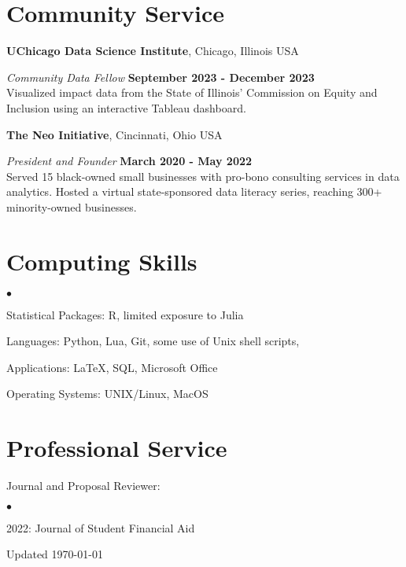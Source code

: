 \documentclass[margin,line]{res}
\newenvironment{list2}{
  \begin{list}{$\bullet$}{%
      \setlength{\itemsep}{0in}
      \setlength{\parsep}{0in} \setlength{\parskip}{0in}
      \setlength{\topsep}{0in} \setlength{\partopsep}{0in} 
      \setlength{\leftmargin}{0.2in}}}{\end{list}}
\begin{document}
\begin{resume}
\section{\sc Community Service}
{\bf UChicago Data Science Institute}, Chicago, Illinois USA

\vspace{-.3cm}
{\em Community Data Fellow} \hfill {\bf September 2023 - December 2023}\\
Visualized impact data from the State of Illinois' Commission on Equity and Inclusion using an interactive Tableau dashboard. 

{\bf The Neo Initiative}, Cincinnati, Ohio USA

\vspace{-.3cm}
{\em President and Founder} \hfill {\bf March 2020 -  May 2022}\\
Served 15 black-owned small businesses with pro-bono consulting services in data analytics. Hosted a virtual state-sponsored data literacy series, reaching 300+ minority-owned businesses. 

\section{\sc Computing Skills} 
\begin{list2}
\item Statistical Packages:  R, limited exposure to Julia
\item Languages:  Python, Lua, Git, some use of Unix shell scripts,
\item Applications: \LaTeX, SQL, Microsoft Office 
\item Operating Systems:  UNIX/Linux, MacOS\\ 
\end{list2}

\section{\sc Professional Service} 
Journal and Proposal Reviewer:\\
\begin{list2}
\item 2022: Journal of Student Financial Aid
\end{list2}

\end{resume}

\begin{center}
  \vfill
  Updated \today
\end{center}
\end{document}
